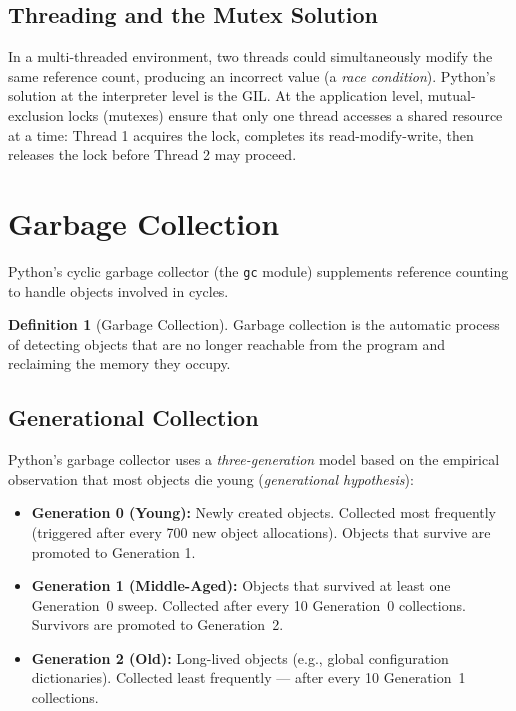 \documentclass[11pt, a4paper, notitlepage]{report}
\theoremstyle{definition}
\newtheorem{definition}[theorem]{Definition}
\theoremstyle{remark}
\theoremstyle{definition}
\begin{document}
\subsection{Threading and the Mutex Solution}
\label{subsec:mutex}

In a multi-threaded environment, two threads could simultaneously modify the same reference
count, producing an incorrect value (a \emph{race condition}). Python's solution at the
interpreter level is the GIL. At the application level, mutual-exclusion locks (mutexes) ensure
that only one thread accesses a shared resource at a time: Thread 1 acquires the lock,
completes its read-modify-write, then releases the lock before Thread 2 may proceed.

\section{Garbage Collection}
\label{sec:gc}

Python's cyclic garbage collector (the \texttt{gc} module) supplements reference counting to
handle objects involved in cycles.

\begin{definition}[Garbage Collection]
Garbage collection is the automatic process of detecting objects that are no longer reachable
from the program and reclaiming the memory they occupy.
\end{definition}

\subsection{Generational Collection}
\label{subsec:generations}

Python's garbage collector uses a \emph{three-generation} model based on the empirical
observation that most objects die young (\emph{generational hypothesis}):

\begin{itemize}
  \item \textbf{Generation 0 (Young):} Newly created objects. Collected most frequently
        (triggered after every 700 new object allocations). Objects that survive are promoted
        to Generation 1.
  \item \textbf{Generation 1 (Middle-Aged):} Objects that survived at least one
        Generation~0 sweep. Collected after every 10 Generation~0 collections. Survivors are
        promoted to Generation~2.
  \item \textbf{Generation 2 (Old):} Long-lived objects (e.g., global configuration
        dictionaries). Collected least frequently --- after every 10 Generation~1 collections.
\end{itemize}
\end{document}
